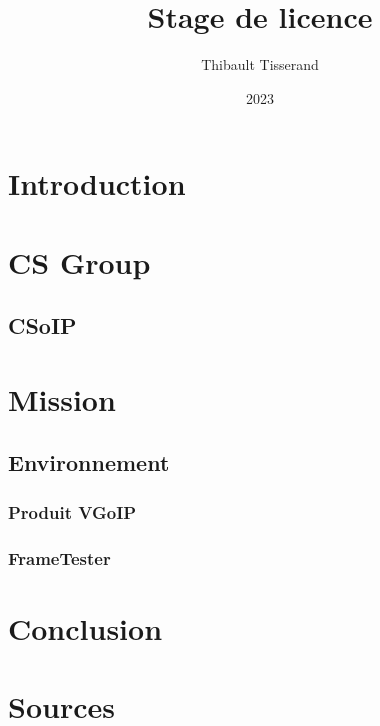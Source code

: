 \documentclass{beamer}
\title{Stage de licence}
\author{Thibault Tisserand}
\institute{Université de Lille}
\date{2023}
\begin{document}
\titlepage



\section{Introduction}


\section{CS Group}


\subsection{CSoIP}


\section{Mission}


\subsection{Environnement}


\subsubsection{Produit VGoIP}


\subsubsection{FrameTester}


\section{Conclusion}


\section{Sources}

\end{document}
